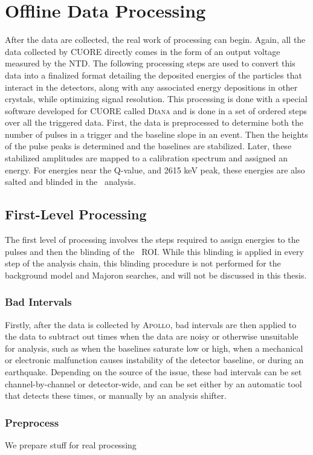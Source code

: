\section{Offline Data Processing}
After the data are collected, the real work of processing can begin.
Again, all the data collected by CUORE directly comes in the form of an output voltage measured by the NTD.
The following processing steps are used to convert this data into a finalized format detailing the deposited energies of the particles that interact in the detectors, along with any associated energy depositions in other crystals, while optimizing signal resolution.
This processing is done with a special software developed for CUORE called \textsc{Diana} and is done in a set of ordered steps over all the triggered data.
First, the data is preprocessed to determine both the number of pulses in a trigger and the baseline slope in an event. 
Then the heights of the pulse peaks is determined and the baselines are stabilized.
Later, these stabilized amplitudes are mapped to a calibration spectrum and assigned an energy.
For energies near the \zeronubb Q-value, and 2615 keV peak, these energies are also salted and blinded in the \zeronubb~analysis.

\subsection*{First-Level Processing}
The first level of processing involves the steps required to assign energies to the pulses and then the blinding of the \zeronubb~ROI.
While this blinding is applied in every step of the analysis chain, this blinding procedure is not performed for the background model and Majoron searches, and will not be discussed in this thesis.
\subsubsection*{Bad Intervals}
Firstly, after the data is collected by \textsc{Apollo}, bad intervals are then applied to the data to subtract out times when the data are noisy or otherwise unsuitable for analysis, such as when the baselines saturate low or high, when a mechanical or electronic malfunction causes instability of the detector baseline, or during an earthquake.
Depending on the source of the issue, these bad intervals can be set channel-by-channel or detector-wide, and can be set either by an automatic tool that detects these times, or manually by an analysis shifter.
\subsubsection*{Preprocess}
We prepare stuff for real processing
